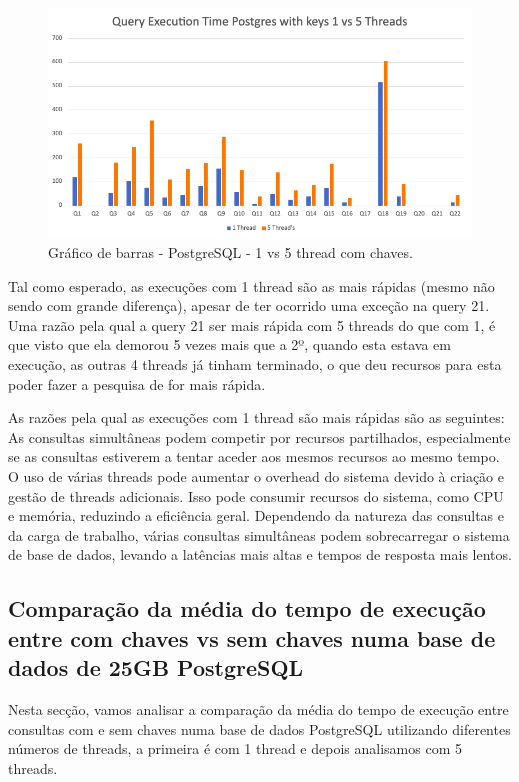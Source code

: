 \documentclass{article}
\begin{document}
  \begin{figure}[H]
    \centering
    \includegraphics[width=\textwidth]{Graphs/postgres_withkeys_1vs5.png}
    \caption{Gráfico de barras - PostgreSQL - 1 vs 5 thread com chaves.} 
    \label{fig:PKCreation2}
  \end{figure}


  Tal como esperado, as execuções com 1 thread são as mais rápidas (mesmo não sendo com grande diferença), apesar de ter ocorrido uma exceção na query 21. Uma razão pela qual a query 21 ser mais rápida com 5 threads do que com 1, é que visto que ela demorou 5 vezes mais que a 2º, quando esta estava em execução, as outras 4 threads já tinham terminado, o que deu recursos para esta poder fazer a pesquisa de for mais rápida.
  
  
  As razões pela qual as execuções com 1 thread são mais rápidas são as seguintes:\\
\quad As consultas simultâneas podem competir por recursos partilhados, especialmente se as consultas estiverem a tentar aceder aos mesmos recursos ao mesmo tempo.
O uso de várias threads pode aumentar o overhead do sistema devido à criação e gestão de threads adicionais. Isso pode consumir recursos do sistema, como CPU e memória, reduzindo a eficiência geral. 
Dependendo da natureza das consultas e da carga de trabalho, várias consultas simultâneas podem sobrecarregar o sistema de base de dados, levando a latências mais altas e tempos de resposta mais lentos. 
 
\clearpage


\clearpage
\subsection{Comparação da média do tempo de execução entre com chaves vs sem chaves numa base de dados de 25GB PostgreSQL}
Nesta secção, vamos analisar a comparação da média do tempo de execução entre consultas com e sem chaves numa base de dados PostgreSQL utilizando diferentes números de threads, a primeira é com 1 thread e depois analisamos com 5 threads.
\end{document}
